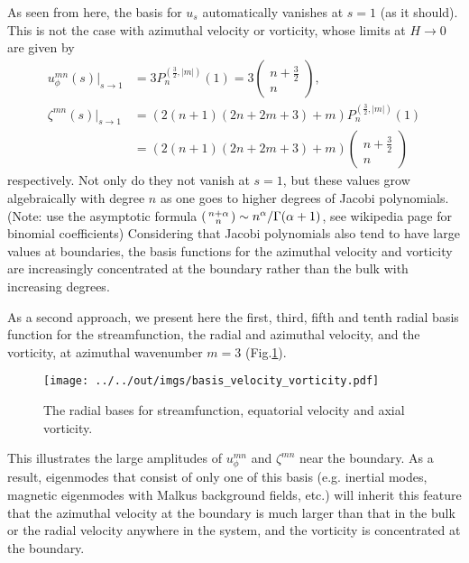 As seen from here, the basis for $u_s$ automatically vanishes at $s=1$ (as it should). This is not the case with azimuthal velocity or vorticity, whose limits at $H\rightarrow 0$ are given by
\[\begin{aligned}
    u_\phi^{mn}(s)|_{s\rightarrow 1} &= 3 P_n^{(\frac{3}{2}, |m|)}(1) = 3 \begin{pmatrix} n + \frac{3}{2} \\ n \end{pmatrix},\\
    \zeta^{mn}(s)|_{s\rightarrow 1} &= \left(2(n+1)(2n+2m+3) + m\right) P_n^{(\frac{3}{2}, |m|)}(1) \\ 
    &= \left(2(n+1)(2n+2m+3) + m\right) \begin{pmatrix} n + \frac{3}{2} \\ n \end{pmatrix}
\end{aligned}\]
respectively. Not only do they not vanish at $s=1$, but these values grow algebraically with degree $n$ as one goes to higher degrees of Jacobi polynomials. (Note: use the asymptotic formula $\begin{psmallmatrix} n+\alpha \\ n \end{psmallmatrix} \sim n^\alpha/\Gamma(\alpha + 1)$, see wikipedia page for binomial coefficients) 
Considering that Jacobi polynomials also tend to have large values at boundaries, the basis functions for the azimuthal velocity and vorticity are increasingly concentrated at the boundary rather than the bulk with increasing degrees.

As a second approach, we present here the first, third, fifth and tenth radial basis function for the streamfunction, the radial and azimuthal velocity, and the vorticity, at azimuthal wavenumber $m=3$ (Fig.\ref{fig:rad-basis}). 
\begin{figure}[htbp]
    \centering
    \texttt{[image: ../../out/imgs/basis\_velocity\_vorticity.pdf]}
    \caption{The radial bases for streamfunction, equatorial velocity and axial vorticity.}
    \label{fig:rad-basis}
\end{figure}
This illustrates the large amplitudes of $u_\phi^{mn}$ and $\zeta^{mn}$ near the boundary.
As a result, eigenmodes that consist of only one of this basis (e.g. inertial modes, magnetic eigenmodes with Malkus background fields, etc.) will inherit this feature that the azimuthal velocity at the boundary is much larger than that in the bulk or the radial velocity anywhere in the system, and the vorticity is concentrated at the boundary.

\clearpage

